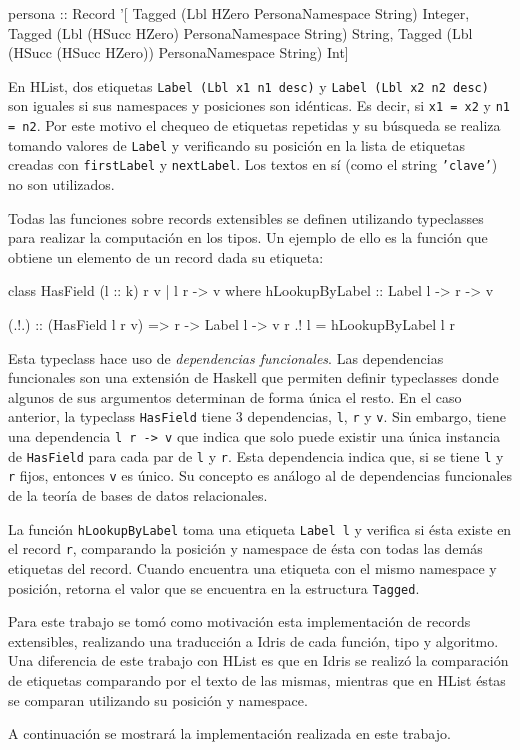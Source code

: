\begin{code}
persona :: Record '[
  Tagged (Lbl HZero 
    PersonaNamespace String) Integer,
  Tagged (Lbl (HSucc HZero) 
    PersonaNamespace String) String,
  Tagged (Lbl (HSucc (HSucc HZero)) 
    PersonaNamespace String) Int]
\end{code}

En HList, dos etiquetas \texttt{Label (Lbl x1 n1 desc)} y \texttt{Label (Lbl x2 n2 desc)} son iguales si sus namespaces y posiciones son idénticas. Es decir, si \texttt{x1 = x2} y \texttt{n1 = n2}. Por este motivo el chequeo de etiquetas repetidas y su búsqueda se realiza tomando valores de \texttt{Label} y verificando su posición en la lista de etiquetas creadas con \texttt{firstLabel} y \texttt{nextLabel}. Los textos en sí (como el string \texttt{'clave'}) no son utilizados.

Todas las funciones sobre records extensibles se definen utilizando typeclasses para realizar la computación en los tipos. Un ejemplo de ello es la función que obtiene un elemento de un record dada su etiqueta:

\begin{code}
class HasField (l :: k) r v | l r -> v where
  hLookupByLabel :: Label l -> r -> v

(.!.) :: (HasField l r v) => r -> Label l -> v
r .! l = hLookupByLabel l r
\end{code}

Esta typeclass hace uso de \textit{dependencias funcionales}. Las dependencias funcionales son una extensión de Haskell que permiten definir typeclasses donde algunos de sus argumentos determinan de forma única el resto. En el caso anterior, la typeclass \texttt{HasField} tiene 3 dependencias, \texttt{l}, \texttt{r} y \texttt{v}. Sin embargo, tiene una dependencia \texttt{l r -> v} que indica que solo puede existir una única instancia de \texttt{HasField} para cada par de \texttt{l} y \texttt{r}. Esta dependencia indica que, si se tiene \texttt{l} y \texttt{r} fijos, entonces \texttt{v} es único. Su concepto es análogo al de dependencias funcionales de la teoría de bases de datos relacionales.

La función \texttt{hLookupByLabel} toma una etiqueta \texttt{Label l} y verifica si ésta existe en el record \texttt{r}, comparando la posición y namespace de ésta con todas las demás etiquetas del record. Cuando encuentra una etiqueta con el mismo namespace y posición, retorna el valor que se encuentra en la estructura \texttt{Tagged}.

Para este trabajo se tomó como motivación esta implementación de records extensibles, realizando una traducción a Idris de cada función, tipo y algoritmo. Una diferencia de este trabajo con HList es que en Idris se realizó la comparación de etiquetas comparando por el texto de las mismas, mientras que en HList éstas se comparan utilizando su posición y namespace.

A continuación se mostrará la implementación realizada en este trabajo.
